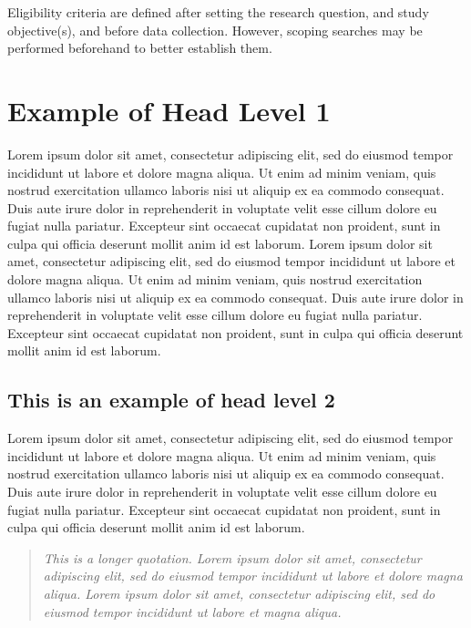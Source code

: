 \documentclass[english]{sbc2025}%
\begin{document}
Eligibility criteria are defined after setting the research question, and study objective(s), and before data collection. However, scoping searches may be performed beforehand to better establish them.
 
\section{Example of Head Level 1}
Lorem ipsum dolor sit amet, consectetur adipiscing elit, sed do eiusmod tempor incididunt ut labore et dolore magna aliqua. Ut enim ad minim veniam, quis nostrud exercitation ullamco laboris nisi ut aliquip ex ea commodo consequat. Duis aute irure dolor in reprehenderit in voluptate velit esse cillum dolore eu fugiat nulla pariatur. Excepteur sint occaecat cupidatat non proident, sunt in culpa qui officia deserunt mollit anim id est laborum. Lorem ipsum dolor sit amet, consectetur adipiscing elit, sed do eiusmod tempor incididunt ut labore et dolore magna aliqua. Ut enim ad minim veniam, quis nostrud exercitation ullamco laboris nisi ut aliquip ex ea commodo consequat. Duis aute irure dolor in reprehenderit in voluptate velit esse cillum dolore eu fugiat nulla pariatur. Excepteur sint occaecat cupidatat non proident, sunt in culpa qui officia deserunt mollit anim id est laborum.

\subsection{This is an example of head level 2}

Lorem ipsum dolor sit amet, consectetur adipiscing elit, sed do eiusmod tempor incididunt ut labore et dolore magna aliqua. Ut enim ad minim veniam, quis nostrud exercitation ullamco laboris nisi ut aliquip ex ea commodo consequat. Duis aute irure dolor in reprehenderit in voluptate velit esse cillum dolore eu fugiat nulla pariatur. Excepteur sint occaecat cupidatat non proident, sunt in culpa qui officia deserunt mollit anim id est laborum.

\begin{quotation}
\textit{This is a longer quotation. Lorem ipsum dolor sit amet, consectetur adipiscing elit, sed do eiusmod tempor incididunt ut labore et dolore magna aliqua. Lorem ipsum dolor sit amet, consectetur adipiscing elit, sed do eiusmod tempor incididunt ut labore et magna aliqua. 
}\end{quotation} 
\end{document}
